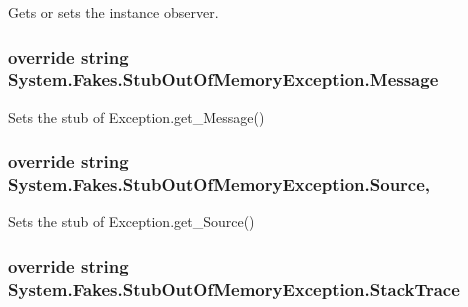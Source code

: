 Gets or sets the instance observer.

\hypertarget{class_system_1_1_fakes_1_1_stub_out_of_memory_exception_a561901d3f33985b5c0bf4ce60b179b3d}{
\subsubsection[{Message}]{\setlength{\rightskip}{0pt plus 5cm}override string System.\-Fakes.\-Stub\-Out\-Of\-Memory\-Exception.\-Message\hspace{0.3cm}{\ttfamily [get]}}}\label{class_system_1_1_fakes_1_1_stub_out_of_memory_exception_a561901d3f33985b5c0bf4ce60b179b3d}


Sets the stub of Exception.\-get\-\_\-\-Message()

\hypertarget{class_system_1_1_fakes_1_1_stub_out_of_memory_exception_aabd5b9a856831adfda6f6e073ac7eff4}{
\subsubsection[{Source}]{\setlength{\rightskip}{0pt plus 5cm}override string System.\-Fakes.\-Stub\-Out\-Of\-Memory\-Exception.\-Source\hspace{0.3cm}{\ttfamily [get]}, {\ttfamily [set]}}}\label{class_system_1_1_fakes_1_1_stub_out_of_memory_exception_aabd5b9a856831adfda6f6e073ac7eff4}


Sets the stub of Exception.\-get\-\_\-\-Source()

\hypertarget{class_system_1_1_fakes_1_1_stub_out_of_memory_exception_abd7c1046e76503355d1c50a0ca6e10b0}{
\subsubsection[{Stack\-Trace}]{\setlength{\rightskip}{0pt plus 5cm}override string System.\-Fakes.\-Stub\-Out\-Of\-Memory\-Exception.\-Stack\-Trace\hspace{0.3cm}{\ttfamily [get]}}}\label{class_system_1_1_fakes_1_1_stub_out_of_memory_exception_abd7c1046e76503355d1c50a0ca6e10b0}


